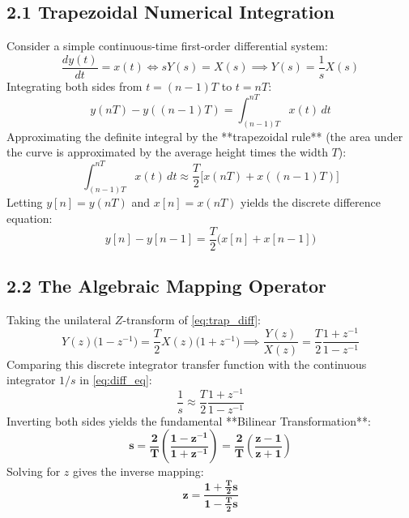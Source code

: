 \documentclass[11pt,a4paper]{article}
\begin{document}
\subsection{2.1 Trapezoidal Numerical Integration}
Consider a simple continuous-time first-order differential system:
\begin{equation}
\frac{dy(t)}{dt} = x(t) \iff s Y(s) = X(s) \implies Y(s) = \frac{1}{s} X(s)
\label{eq:diff_eq}
\end{equation}
Integrating both sides from $t = (n-1)T$ to $t = n T$:
\begin{equation}
y(nT) - y((n-1)T) = \int_{(n-1)T}^{nT} x(t) \, dt
\end{equation}
Approximating the definite integral by the **trapezoidal rule** (the area under the curve is approximated by the average height times the width $T$):
\begin{equation}
\int_{(n-1)T}^{nT} x(t) \, dt \approx \frac{T}{2}\big[ x(nT) + x((n-1)T) \big]
\end{equation}
Letting $y[n] = y(nT)$ and $x[n] = x(nT)$ yields the discrete difference equation:
\begin{equation}
y[n] - y[n-1] = \frac{T}{2}\big(x[n] + x[n-1]\big)
\label{eq:trap_diff}
\end{equation}

\subsection{2.2 The Algebraic Mapping Operator}
Taking the unilateral $Z$-transform of \eqref{eq:trap_diff}:
\begin{equation}
Y(z)\big(1 - z^{-1}\big) = \frac{T}{2} X(z)\big(1 + z^{-1}\big) \implies \frac{Y(z)}{X(z)} = \frac{T}{2} \frac{1 + z^{-1}}{1 - z^{-1}}
\end{equation}
Comparing this discrete integrator transfer function with the continuous integrator $1/s$ in \eqref{eq:diff_eq}:
\begin{equation}
\frac{1}{s} \approx \frac{T}{2} \frac{1 + z^{-1}}{1 - z^{-1}}
\end{equation}
Inverting both sides yields the fundamental **Bilinear Transformation**:
\begin{equation}
\mathbf{s = \frac{2}{T} \left( \frac{1 - z^{-1}}{1 + z^{-1}} \right) = \frac{2}{T} \left( \frac{z - 1}{z + 1} \right)}
\label{eq:blt_s}
\end{equation}
Solving for $z$ gives the inverse mapping:
\begin{equation}
\mathbf{z = \frac{1 + \frac{T}{2}s}{1 - \frac{T}{2}s}}
\label{eq:blt_z}
\end{equation}
\end{document}
